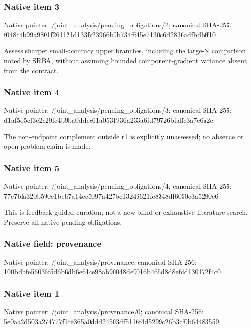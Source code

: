 \documentclass[10pt,a4paper]{article}
\begin{document}
\subsubsection{Native item 3}
Native pointer: /joint\_\allowbreak{}analysis/pending\_\allowbreak{}obligations/2; canonical SHA-256: f048c4b99a9801f261121d133fc23966b0b734f645e7130c6d2836adfbdbff10

\begingroup\raggedright\sloppy Assess sharper small-accuracy upper branches,\allowbreak{} including the large-N comparison noted by SRBA,\allowbreak{} without assuming bounded component-gradient variance absent from the contract.\par\endgroup

\subsubsection{Native item 4}
Native pointer: /joint\_\allowbreak{}analysis/pending\_\allowbreak{}obligations/3; canonical SHA-256: d1af5d5cf3e2c29fc4b9ba0ddcc61a0531936a233a6fd79726bfaffc3a7e6a2c

\begingroup\raggedright\sloppy The non-endpoint complement outside r1 is explicitly unassessed;\allowbreak{} no absence or open-problem claim is made.\par\endgroup

\subsubsection{Native item 5}
Native pointer: /joint\_\allowbreak{}analysis/pending\_\allowbreak{}obligations/4; canonical SHA-256: 77c7bfa320b590e1beb7a14ec5097a427bc13246621fe8348df6050c3a5280e6

\begingroup\raggedright\sloppy This is feedback-guided curation,\allowbreak{} not a new blind or exhaustive literature search. Preserve all native pending obligations.\par\endgroup

\subsubsection{Native field: provenance}
Native pointer: /joint\_\allowbreak{}analysis/provenance; canonical SHA-256: 100bdbfe56035f5d6b6db6e61ce98ab90048de9016b465d8d8efdd130172f4c0

\subsubsection{Native item 1}
Native pointer: /joint\_\allowbreak{}analysis/provenance/0; canonical SHA-256: 5e0aa2d503a274777f1ce365a0ddd24503df5116f4d5299c26b3cf0b64483559
\end{document}
